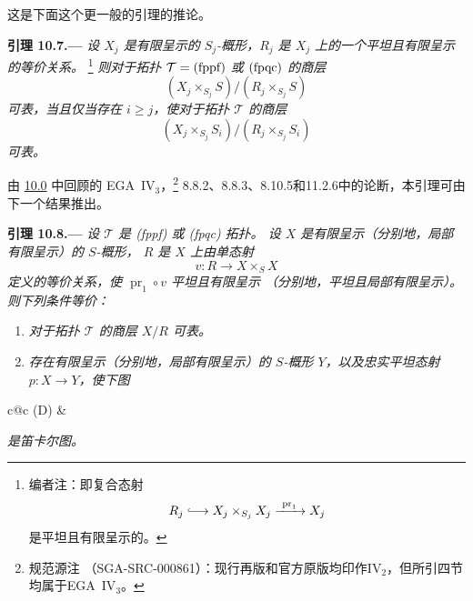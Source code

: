 这是下面这个更一般的引理的推论。

\medskip
{}\label{lem:sga3-VIB-10.7}%
\noindent\textbf{引理 10.7.---}
\emph{设 \(X_j\) 是有限呈示的 \(S_j\)-概形，\(R_j\) 是
\(X_j\) 上的一个平坦且有限呈示的等价关系。}%
\footnote{\label{note:sga3-VIB-94}编者注：即复合态射
\[
  R_j\lhook\joinrel\longrightarrow X_j\times_{S_j}X_j
  \xrightarrow{\ \operatorname{pr}_1\ }X_j
\]
是平坦且有限呈示的。}
\emph{则对于拓扑 \(\mathcal T=\textup{(fppf)}\) 或
\(\textup{(fpqc)}\) 的商层}
\[
  (X_j\times_{S_j}S)/(R_j\times_{S_j}S)
\]
\emph{可表，当且仅当存在 \(i\geq j\)，使对于拓扑 \(\mathcal T\) 的商层}
\[
  (X_j\times_{S_j}S_i)/(R_j\times_{S_j}S_i)
\]
\emph{可表。}

由 \hyperref[par:sga3-VIB-10.0]{10.0} 中回顾的 EGA~IV\(_3\)，\footnote{规范源注
（SGA-SRC-000861）：现行再版和官方原版均印作IV\(_2\)，但所引四节均属于EGA~IV\(_3\)。}
8.8.2、8.8.3、8.10.5和11.2.6中的论断，本引理可由下一个结果推出。

\medskip
{}\label{lem:sga3-VIB-10.8}%
\noindent\textbf{引理 10.8.---}
\emph{设 \(\mathcal T\) 是 \textup{(fppf)} 或 \textup{(fpqc)} 拓扑。
设 \(X\) 是有限呈示\textup{（分别地，局部有限呈示）}的 \(S\)-概形，
\(R\) 是 \(X\) 上由单态射}
\[
  v:R\longrightarrow X\times_S X
\]
\emph{定义的等价关系，使 \(\operatorname{pr}_1\circ v\) 平坦且有限呈示
\textup{（分别地，平坦且局部有限呈示）}。则下列条件等价：}
\begin{enumerate}
\item[\textup{(i)}]\label{concl:sga3-VIB-10.8-i}
  \emph{对于拓扑 \(\mathcal T\) 的商层 \(X/R\) 可表。}

\item[\textup{(ii)}]\label{concl:sga3-VIB-10.8-ii}
  \emph{存在有限呈示\textup{（分别地，局部有限呈示）}的 \(S\)-概形
  \(Y\)，以及忠实平坦态射 \(p:X\to Y\)，使下图}
\end{enumerate}
\begin{center}
  \label{diag:sga3-VIB-10.8-D}%
  \begin{tabular}{c@{\qquad}c}
    \textup{(D)} &
  \end{tabular}
\end{center}
\emph{是笛卡尔图。}

